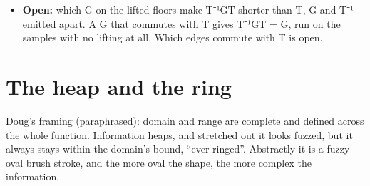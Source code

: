 \begin{itemize}
\begin{itemize}
\item An edge permutes the low k bits of a coefficient through a table π (k ≤ 20) and passes its high bits.
\item For every integer v: E(v) = (v − AND(v, 2\textasciicircum{}k − 1)) + TABLE\_\allowbreak{}π(AND(v, 2\textasciicircum{}k − 1)).
\item The and is v's residue, never negative and k bits wide, and the table step indexes by it. v less its residue has k low zero bits, and the sum puts π's value in them. For a 32-bit word it agrees with the kernel's (word \& \textasciitilde{}mask) | π(word \& mask).
\item E is a bijection of the integers. T⁻¹ET is a bijection of the samples with inverse T⁻¹E⁻¹T. An edge on level ℓ's high-pass coefficients costs ℓ levels each way.
\item An edge moves a coefficient by less than 2\textasciicircum{}k. A wrap placed after an edge needs its bound raised by 2\textasciicircum{}k, or it is silently wrong.
\end{itemize}
\item \textbf{Open:} which G on the lifted floors make T⁻¹GT shorter than T, G and T⁻¹ emitted apart. A G that commutes with T gives T⁻¹GT = G, run on the samples with no lifting at all. Which edges commute with T is open.
\end{itemize}

\section{\texorpdfstring{The heap and the ring}{The heap and the ring}}

Doug's framing (paraphrased): domain and range are complete and defined across the whole function. Information heaps, and stretched out it looks fuzzed, but it always stays within the domain's bound, “ever ringed”. Abstractly it is a fuzzy oval brush stroke, and the more oval the shape, the more complex the information.

